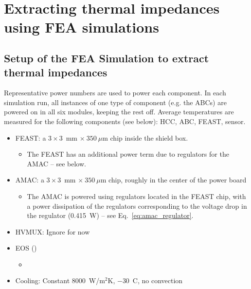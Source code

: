 
\section{ Extracting thermal impedances using FEA simulations}


\subsection{Setup of the FEA Simulation to extract thermal impedances}

Representative power numbers are used to power each component. In each simulation run, all instances
of one type of component (e.g. the ABCs) are powered on in all six modules, keeping the rest off.
Average temperatures are measured for the following components (see below): HCC, ABC, FEAST, sensor.

\def\thcc{\ensuremath{\overline{T}_\text{nHCC}}}
\def\tabc{\ensuremath{\overline{T}_\text{nABC}}}
\def\tfeast{\ensuremath{\overline{T}_\text{FEAST}}}
\def\tsensor{\ensuremath{T_\text{sensor}}}
\def\Rm{\ensuremath{{\text{R}m}}}

\begin{itemize}
\item FEAST: a $3\times3$~mm $\times~350~\mu$m chip inside the shield box.
  \begin{itemize}
  \item The FEAST has an additional power term due to regulators for the AMAC -- see below.
  \end{itemize}
\item AMAC: a $3\times3$~mm $\times~350~\mu$m chip, roughly in the center of the power board
  \begin{itemize}
    \item The AMAC is powered using regulators located in the FEAST chip, with a power dissipation
      of the regulators corresponding to the voltage drop in the regulator (0.415~W) -- see Eq.~\ref{eq:amac_regulator}.
  \end{itemize}
\item HVMUX: Ignore for now
\item EOS () %
  \begin{itemize}
  \item {}
  \end{itemize}
\item Cooling: Constant 8000~W/m$^{2}$K, $-30$~C, no convection
\end{itemize}




